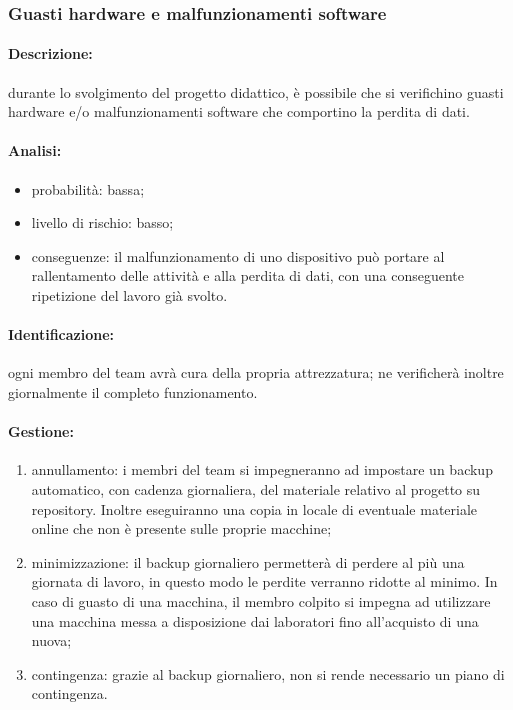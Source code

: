 \documentclass[../PianoProgetto.tex]{subfiles}
\begin{document}
	\subsubsection{Guasti hardware e malfunzionamenti software}
	
	\paragraph*{Descrizione:} durante lo svolgimento del progetto didattico, è possibile che si verifichino guasti hardware e/o malfunzionamenti software che comportino la perdita di dati.
	
	\paragraph*{Analisi:}
	\begin{itemize}
		\item probabilità: bassa;
		\item livello di rischio: basso;
		\item conseguenze: il malfunzionamento di uno dispositivo può portare al rallentamento delle attività e alla perdita di dati, con una conseguente ripetizione del lavoro già svolto.
	\end{itemize}
	
	\paragraph*{Identificazione:} ogni membro del team avrà cura della propria attrezzatura; ne verificherà inoltre giornalmente il completo funzionamento.
	
	\paragraph*{Gestione:}
	\begin{enumerate}
		\item annullamento: i membri del team si impegneranno ad impostare un backup automatico, con cadenza giornaliera, del materiale relativo al progetto su repository. Inoltre eseguiranno una copia in locale di eventuale materiale online che non è presente sulle proprie macchine;
		\item minimizzazione: il backup giornaliero permetterà di perdere al più una giornata di lavoro, in questo modo le perdite verranno ridotte al minimo. In caso di guasto di una macchina, il membro colpito si impegna ad utilizzare una macchina messa a disposizione dai laboratori fino all'acquisto di una nuova;
		\item contingenza: grazie al backup giornaliero, non si rende necessario un piano di contingenza.
	\end{enumerate} 	
	
\end{document}

